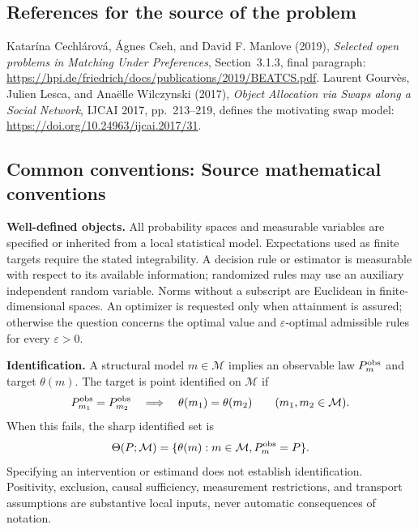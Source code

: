 \documentclass[11pt,a4paper]{article}
\begin{document}
\subsection*{References for the source of the problem}
Katar\'ina Cechl\'arov\'a, \'Agnes Cseh, and David F. Manlove (2019), \emph{Selected open problems in Matching Under Preferences}, Section~3.1.3, final paragraph: \url{https://hpi.de/friedrich/docs/publications/2019/BEATCS.pdf}. Laurent Gourv\`es, Julien Lesca, and Ana\"elle Wilczynski (2017), \emph{Object Allocation via Swaps along a Social Network}, IJCAI 2017, pp.~213--219, defines the motivating swap model: \url{https://doi.org/10.24963/ijcai.2017/31}.

\subsection*{Common conventions: Source mathematical conventions}

\textbf{Well-defined objects.}
All probability spaces and measurable variables are specified or inherited
from a local statistical model. Expectations used as finite targets require
the stated integrability. A decision rule or estimator is measurable with
respect to its available information; randomized rules may use an auxiliary
independent random variable. Norms without a subscript are Euclidean in
finite-dimensional spaces. An optimizer is requested only when attainment
is assured; otherwise the question concerns the optimal value and
$\varepsilon$-optimal admissible rules for every $\varepsilon>0$.

\textbf{Identification.}
A structural model $m\in\mathcal M$ implies an observable law
$P_m^{\rm obs}$ and target $\theta(m)$. The target is point identified on
$\mathcal M$ if
\[
 P_{m_1}^{\rm obs}=P_{m_2}^{\rm obs}
 \quad\Longrightarrow\quad\theta(m_1)=\theta(m_2)
 \qquad(m_1,m_2\in\mathcal M).
\]
When this fails, the sharp identified set is
\[
 \Theta(P;\mathcal M)=\{\theta(m):m\in\mathcal M,
                                  P_m^{\rm obs}=P\}.
\]
Specifying an intervention or estimand does not establish identification.
Positivity, exclusion, causal sufficiency, measurement restrictions, and
transport assumptions are substantive local inputs, never automatic
consequences of notation.
\end{document}
